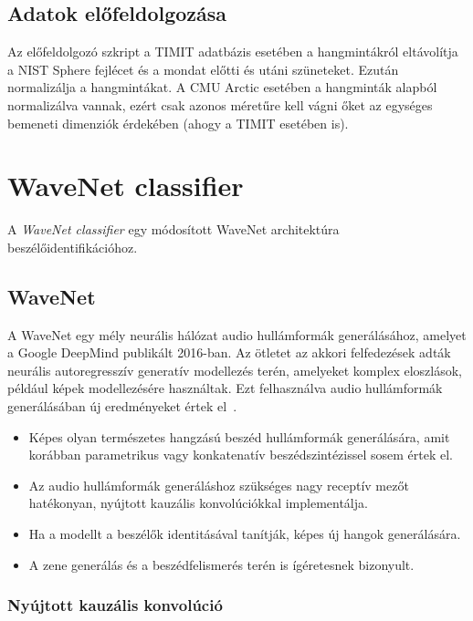 \subsection{Adatok előfeldolgozása}

Az előfeldolgozó szkript a TIMIT adatbázis esetében a hangmintákról eltávolítja a NIST Sphere fejlécet és a mondat előtti és utáni szüneteket. Ezután normalizálja a hangmintákat. A CMU Arctic esetében a hangminták alapból normalizálva vannak, ezért csak azonos méretűre kell vágni őket az egységes bemeneti dimenziók érdekében (ahogy a TIMIT esetében is).

\section{WaveNet classifier}

A \emph{WaveNet classifier} egy módosított WaveNet architektúra beszélőidentifikációhoz.

\subsection{WaveNet}

A WaveNet egy mély neurális hálózat audio hullámformák generálásához, amelyet a Google DeepMind publikált 2016-ban. Az ötletet az akkori felfedezések adták neurális autoregresszív generatív modellezés terén, amelyeket komplex eloszlások, például képek modellezésére használtak. Ezt felhasználva audio hullámformák generálásában új eredményeket értek el~\cite{wavenet}.

\begin{itemize}
	\item Képes olyan természetes hangzású beszéd hullámformák generálására, amit korábban parametrikus vagy konkatenatív beszédszintézissel sosem értek el. 
	\item Az audio hullámformák generáláshoz szükséges nagy receptív mezőt hatékonyan, nyújtott kauzális konvolúciókkal implementálja.
	\item Ha a modellt a beszélők identitásával tanítják, képes új hangok generálására.
	\item A zene generálás és a beszédfelismerés terén is ígéretesnek bizonyult.
\end{itemize}

\subsubsection{Nyújtott kauzális konvolúció}

